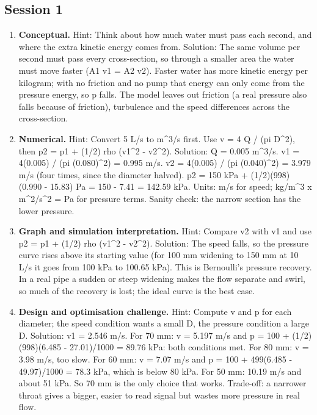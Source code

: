 \documentclass[11pt,a4paper]{article}
\begin{document}
\subsection*{Session 1}
\begin{enumerate}[nosep]
\item \textbf{Conceptual.} Hint: Think about how much water must pass each second, and where the extra kinetic energy comes from. Solution: The same volume per second must pass every cross-section, so through a smaller area the water must move faster (A1 v1 = A2 v2). Faster water has more kinetic energy per kilogram; with no friction and no pump that energy can only come from the pressure energy, so p falls. The model leaves out friction (a real pressure also falls because of friction), turbulence and the speed differences across the cross-section.
\item \textbf{Numerical.} Hint: Convert 5 L/s to m\textasciicircum{}3/s first. Use v = 4 Q / (pi D\textasciicircum{}2), then p2 = p1 + (1/2) rho (v1\textasciicircum{}2 - v2\textasciicircum{}2). Solution: Q = 0.005 m\textasciicircum{}3/s. v1 = 4(0.005) / (pi (0.080)\textasciicircum{}2) = 0.995 m/s. v2 = 4(0.005) / (pi (0.040)\textasciicircum{}2) = 3.979 m/s (four times, since the diameter halved). p2 = 150 kPa + (1/2)(998)(0.990 - 15.83) Pa = 150 - 7.41 = 142.59 kPa. Units: m/s for speed; kg/m\textasciicircum{}3 x m\textasciicircum{}2/s\textasciicircum{}2 = Pa for pressure terms. Sanity check: the narrow section has the lower pressure.
\item \textbf{Graph and simulation interpretation.} Hint: Compare v2 with v1 and use p2 = p1 + (1/2) rho (v1\textasciicircum{}2 - v2\textasciicircum{}2). Solution: The speed falls, so the pressure curve rises above its starting value (for 100 mm widening to 150 mm at 10 L/s it goes from 100 kPa to 100.65 kPa). This is Bernoulli's pressure recovery. In a real pipe a sudden or steep widening makes the flow separate and swirl, so much of the recovery is lost; the ideal curve is the best case.
\item \textbf{Design and optimisation challenge.} Hint: Compute v and p for each diameter; the speed condition wants a small D, the pressure condition a large D. Solution: v1 = 2.546 m/s. For 70 mm: v = 5.197 m/s and p = 100 + (1/2)(998)(6.485 - 27.01)/1000 = 89.76 kPa: both conditions met. For 80 mm: v = 3.98 m/s, too slow. For 60 mm: v = 7.07 m/s and p = 100 + 499(6.485 - 49.97)/1000 = 78.3 kPa, which is below 80 kPa. For 50 mm: 10.19 m/s and about 51 kPa. So 70 mm is the only choice that works. Trade-off: a narrower throat gives a bigger, easier to read signal but wastes more pressure in real flow.
\end{enumerate}
\end{document}
